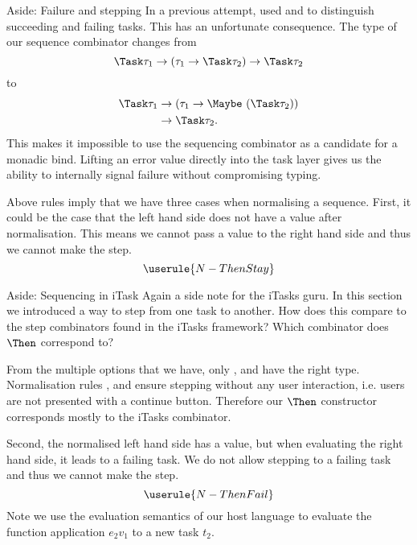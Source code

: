 \begin{margintext}{Aside: Failure and stepping}
  In a previous attempt,
  \textcite{theses/radboud/VinterHviid18} used  and 
  to distinguish succeeding and failing tasks.
  This has an unfortunate consequence.
  The type of our sequence combinator changes from
  \begin{equation*}
    \Task \tau_1 \to (\tau_1 \to \Task \tau_2) \to \Task \tau_2
  \end{equation*}
  to
  \begin{equation*}
    \begin{split}
      \Task \tau_1 &\to (\tau_1 \to \Maybe\ (\Task \tau_2))\\
                   &\to \Task \tau_2.
    \end{split}
  \end{equation*}
  This makes it impossible to use the sequencing combinator as a candidate for a monadic bind.
  Lifting an error value directly into the task layer gives us the ability to internally signal failure
  without compromising typing.
\end{margintext}

Above rules imply that we have three cases when normalising a sequence.
First,
it could be the case that the left hand side does not have a value after normalisation.
This means we cannot pass a value to the right hand side
and thus we cannot make the step.
\begin{equation*}
  \userule{N-ThenStay}
\end{equation*}

\begin{margintext}{Aside: Sequencing in iTask}
  Again a side note for the iTasks guru.
  In this section we introduced a way to step from one task to another.
  How does this compare to the step combinators found in the iTasks framework?
  Which combinator does $\Then$ correspond to?

  From the multiple options that we have,
  only \type{(>>=)}, \type{(>>-)} and \type{(>>\texttilde)} have the right type.
  Normalisation rules ,  and  ensure stepping without any user interaction,
  i.e. users are not presented with a continue button.
  Therefore our $\Then$ constructor corresponds mostly to the iTasks \type{(>>-)} combinator.
\end{margintext}

Second,
the normalised left hand side has a value,
but when evaluating the right hand side,
it leads to a failing task.
We do not allow stepping to a failing task
and thus we cannot make the step.
\begin{equation*}
  \userule{N-ThenFail}
\end{equation*}
Note we use the evaluation semantics of our host language
to evaluate the function application $e_2 v_1$ to a new task $t_2$.

